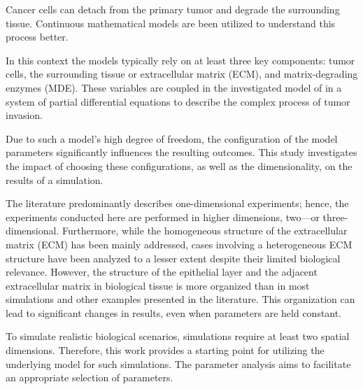 Cancer cells can detach from the primary tumor and degrade the surrounding tissue. 
Continuous mathematical models are been utilized to understand this process better.

In this context the models typically rely on at least three key components: tumor cells, the surrounding tissue or extracellular matrix (ECM), and matrix-degrading enzymes (MDE). These variables are coupled in the investigated model of in a  system of partial differential equations to describe the complex process of tumor invasion.

Due to such a model's high degree of freedom, the configuration of the model parameters significantly influences the resulting outcomes. This study investigates the impact of choosing these configurations, as well as the dimensionality, on the results of a simulation.

The literature predominantly describes one-dimensional experiments; hence, the experiments conducted here are performed in higher dimensions, two—or three-dimensional. Furthermore, while the homogeneous structure of the extracellular matrix (ECM) has been mainly addressed, cases involving a heterogeneous ECM structure have been analyzed to a lesser extent despite their limited biological relevance. However, the structure of the epithelial layer and the adjacent extracellular matrix in biological tissue is more organized than in most simulations and other examples presented in the literature. This organization can lead to significant changes in results, even when parameters are held constant.

To simulate realistic biological scenarios, simulations require at least two spatial dimensions. Therefore, this work provides a starting point for utilizing the underlying model for such simulations. The parameter analysis aims to facilitate an appropriate selection of parameters.
